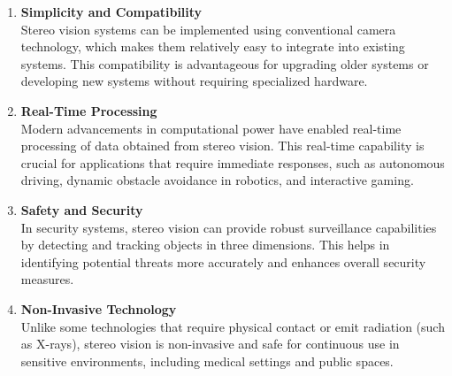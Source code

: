 \documentclass[22pt]{report}
\begin{document}
\begin{enumerate}
            \item \textbf{Simplicity and Compatibility}\\
                Stereo vision systems can be implemented using conventional camera technology, which makes them relatively easy to integrate into existing systems. This compatibility is advantageous for upgrading older systems or developing new systems without requiring specialized hardware.
            \item \textbf{Real-Time Processing}\\
                Modern advancements in computational power have enabled real-time processing of data obtained from stereo vision. This real-time capability is crucial for applications that require immediate responses, such as autonomous driving, dynamic obstacle avoidance in robotics, and interactive gaming.
            \item \textbf{Safety and Security}\\
                In security systems, stereo vision can provide robust surveillance capabilities by detecting and tracking objects in three dimensions. This helps in identifying potential threats more accurately and enhances overall security measures.
            \item \textbf{Non-Invasive Technology}\\
                Unlike some technologies that require physical contact or emit radiation (such as X-rays), stereo vision is non-invasive and safe for continuous use in sensitive environments, including medical settings and public spaces.   
        \end{enumerate}
\end{document}

